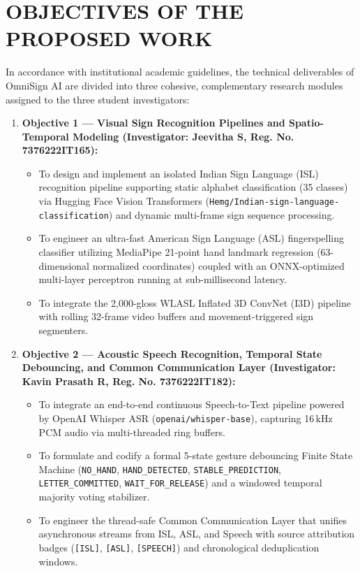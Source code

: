 \documentclass[12pt,a4paper]{report}
\begin{document}
\section{OBJECTIVES OF THE PROPOSED WORK} \label{sec:obj-proj}
In accordance with institutional academic guidelines, the technical deliverables of OmniSign AI are divided into three cohesive, complementary research modules assigned to the three student investigators:
\begin{enumerate}
\item \textbf{Objective 1 --- Visual Sign Recognition Pipelines and Spatio-Temporal Modeling (Investigator: Jeevitha S, Reg. No. 7376222IT165):}
\begin{itemize}[noitemsep, topsep=2pt]
\item To design and implement an isolated Indian Sign Language (ISL) recognition pipeline supporting static alphabet classification (35 classes) via Hugging Face Vision Transformers (\texttt{Hemg/Indian-sign-language-classification}) and dynamic multi-frame sign sequence processing.
\item To engineer an ultra-fast American Sign Language (ASL) fingerspelling classifier utilizing MediaPipe 21-point hand landmark regression (63-dimensional normalized coordinates) coupled with an ONNX-optimized multi-layer perceptron running at sub-millisecond latency.
\item To integrate the 2,000-gloss WLASL Inflated 3D ConvNet (I3D) pipeline with rolling 32-frame video buffers and movement-triggered sign segmenters.
\end{itemize}

\item \textbf{Objective 2 --- Acoustic Speech Recognition, Temporal State Debouncing, and Common Communication Layer (Investigator: Kavin Prasath R, Reg. No. 7376222IT182):}
\begin{itemize}[noitemsep, topsep=2pt]
\item To integrate an end-to-end continuous Speech-to-Text pipeline powered by OpenAI Whisper ASR (\texttt{openai/whisper-base}), capturing 16\,kHz PCM audio via multi-threaded ring buffers.
\item To formulate and codify a formal 5-state gesture debouncing Finite State Machine (\texttt{NO\_HAND}, \texttt{HAND\_DETECTED}, \texttt{STABLE\_PREDICTION}, \texttt{LETTER\_COMMITTED}, \texttt{WAIT\_FOR\_RELEASE}) and a windowed temporal majority voting stabilizer.
\item To engineer the thread-safe Common Communication Layer that unifies asynchronous streams from ISL, ASL, and Speech with source attribution badges (\texttt{[ISL]}, \texttt{[ASL]}, \texttt{[SPEECH]}) and chronological deduplication windows.
\end{itemize}


\end{enumerate}
\end{document}
